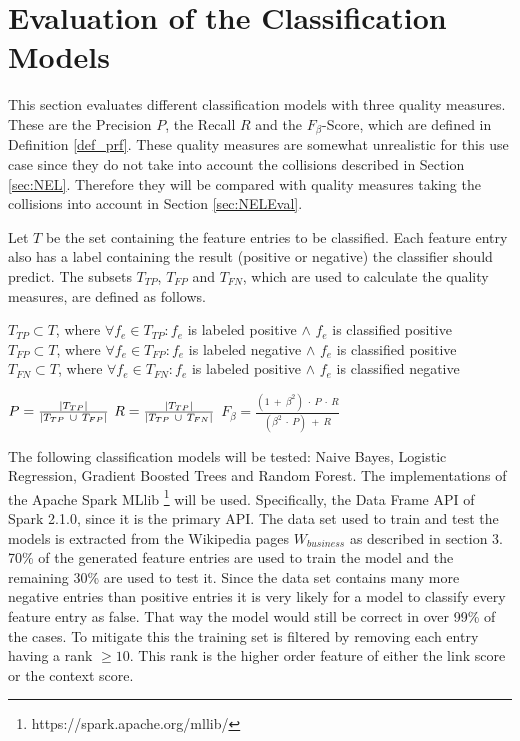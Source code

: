 \section{Evaluation of the Classification Models}
\label{sec:ModelEval}
This section evaluates different classification models with three quality measures. These are the Precision $P$, the Recall $R$ and the $F_{\beta}$-Score, which are defined in Definition \ref{def_prf}. These quality measures are somewhat unrealistic for this use case since they do not take into account the collisions described in Section \ref{sec:NEL}. Therefore they will be compared with quality measures taking the collisions into account in Section \ref{sec:NELEval}.\par
Let $T$ be the set containing the feature entries to be classified. Each feature entry also has a label containing the result (positive or negative) the classifier should predict. The subsets $T_{TP}$, $T_{FP}$ and $T_{FN}$, which are used to calculate the quality measures, are defined as follows.\\
\begin{nscenter}
	$T_{TP} \subset T$, where $\forall f_e \in T_{TP}: f_e$ is labeled positive $\land$ $f_e$ is classified positive\\
	$T_{FP} \subset T$, where $\forall f_e \in T_{FP}: f_e$ is labeled negative $\land$ $f_e$ is classified positive\\
	$T_{FN} \subset T$, where $\forall f_e \in T_{FN}: f_e$ is labeled positive $\land$ $f_e$ is classified negative\\
\end{nscenter}
\begin{definition}
$P = \frac{\left|T_{TP}\right|}{\left|T_{TP} \ \cup \ T_{FP}\right|}$
$R = \frac{\left|T_{TP}\right|}{\left|T_{TP} \ \cup \ T_{FN}\right|}$
$F_{\beta} = \frac{(1 \ + \ \beta^2) \ \cdot \ P \ \cdot \ R}{(\beta^2 \ \cdot \ P) \ + \ R}$
\label{def_prf}
\end{definition}
The following classification models will be tested: Naive Bayes, Logistic Regression, Gradient Boosted Trees and Random Forest. The implementations of the Apache Spark MLlib \footnote{https://spark.apache.org/mllib/} will be used. Specifically, the Data Frame API of Spark 2.1.0, since it is the primary API. The data set used to train and test the models is extracted from the Wikipedia pages $W_{business}$ as described in section 3. 70\% of the generated feature entries are used to train the model and the remaining 30\% are used to test it. Since the data set contains many more negative entries than positive entries it is very likely for a model to classify every feature entry as false. That way the model would still be correct in over 99\% of the cases. To mitigate this the training set is filtered by removing each entry having a rank $\geq 10$. This rank is the higher order feature of either the link score or the context score.\par
